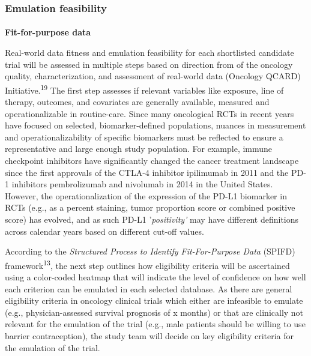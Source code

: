 \documentclass[
  letterpaper,
  DIV=11,
  numbers=noendperiod]{scrartcl}
\makeatletter
\let\oldparagraph\paragraph
\renewcommand{\paragraph}{
    \@ifstar
      \xxxParagraphStar
      \xxxParagraphNoStar
  }
\newcommand{\xxxParagraphStar}[1]{\oldparagraph*{#1}\mbox{}}
\newcommand{\xxxParagraphNoStar}[1]{\oldparagraph{#1}\mbox{}}
\makeatother
\begin{document}
\subsubsection{Emulation feasibility}\label{emulation-feasibility}

\paragraph{\texorpdfstring{\textbf{Fit-for-purpose
data}}{Fit-for-purpose data}}\label{fit-for-purpose-data}

Real-world data fitness and emulation feasibility for each shortlisted
candidate trial will be assessed in multiple steps based on direction
from of the oncology quality, characterization, and assessment of
real-world data (Oncology QCARD) Initiative.\textsuperscript{19} The
first step assesses if relevant variables like exposure, line of
therapy, outcomes, and covariates are generally available, measured and
operationalizable in routine-care. Since many oncological RCTs in recent
years have focused on selected, biomarker-defined populations, nuances
in measurement and operationalizability of specific biomarkers must be
reflected to ensure a representative and large enough study population.
For example, immune checkpoint inhibitors have significantly changed the
cancer treatment landscape since the first approvals of the CTLA-4
inhibitor ipilimumab in 2011 and the PD-1 inhibitors pembrolizumab and
nivolumab in 2014 in the United States. However, the operationalization
of the expression of the PD-L1 biomarker in RCTs (e.g., as a percent
staining, tumor proportion score or combined positive score) has
evolved, and as such PD-L1 '\emph{positivity'} may have different
definitions across calendar years based on different cut-off values.

According to the \emph{Structured Process to Identify Fit-For-Purpose
Data} (SPIFD) framework\textsuperscript{13}, the next step outlines how
eligibility criteria will be ascertained using a color-coded heatmap
that will indicate the level of confidence on how well each criterion
can be emulated in each selected database. As there are general
eligibility criteria in oncology clinical trials which either are
infeasible to emulate (e.g., physician-assessed survival prognosis of x
months) or that are clinically not relevant for the emulation of the
trial (e.g., male patients should be willing to use barrier
contraception), the study team will decide on key eligibility criteria
for the emulation of the trial.
\end{document}
